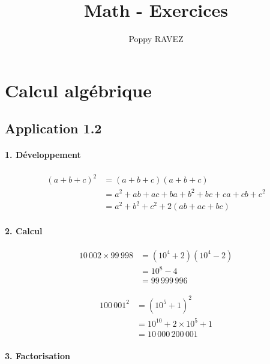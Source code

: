 \documentclass{report}
\title{Math - Exercices}
\author{Poppy RAVEZ}
\begin{document}
\maketitle


\chapter{Calcul algébrique}

\section*{Application 1.2}

\subsubsection*{1. Développement}
\begin{equation*}
\begin{split}
	(a+b+c)^{2} &= (a+b+c)(a+b+c) \\
	            &= a^{2}+ab+ac+ba+b^{2}+bc+ca+cb+c^{2}\\
	            &= a^{2}+b^{2}+c^{2} + 2(ab+ac+bc)
\end{split}	
\end{equation*}


\subsubsection*{2. Calcul}

\begin{equation*}
	\begin{split}
		10\,002 \times 99\,998 &= (10^4 +2)(10^4 - 2) \\
		                       &= 10^8 - 4 \\
		                       &= 99\,999\,996
	\end{split}
\end{equation*}

\begin{equation*}
	\begin{split}
		100\,001^2 &= (10^5 + 1)^2 \\
		           &= 10^{10} + 2 \times 10^5 + 1 \\
		           &= 10\,000\,200\,001
	\end{split}
\end{equation*}



\subsubsection*{3. Factorisation}
\end{document}
